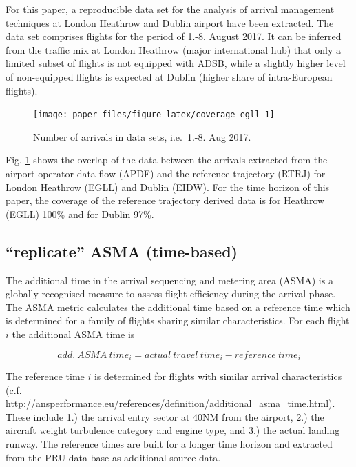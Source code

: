\documentclass[conference,final,a4paper,]{IEEEtran}
\begin{document}
For this paper, a reproducible data set for the analysis of arrival management techniques at London Heathrow and Dublin airport have been extracted.
The data set comprises flights for the period of 1.-8. August 2017.
It can be inferred from the traffic mix at London Heathrow (major international hub) that only a limited subset of flights is not equipped with ADSB, while a slightly higher level of non-equipped flights is expected at Dublin (higher share of intra-European flights).



\begin{figure}[hbt]

{\centering \texttt{[image: paper\_files/figure-latex/coverage-egll-1]} 

}

\caption{Number of arrivals in data sets, i.e.~1.-8. Aug 2017.}\label{fig:coverage-egll}
\end{figure}

Fig. \ref{fig:coverage-egll} shows the overlap of the data between the arrivals extracted from the airport operator data flow (APDF) and the reference trajectory (RTRJ) for London Heathrow (EGLL) and Dublin (EIDW).
For the time horizon of this paper, the coverage of the reference trajectory derived data is for Heathrow (EGLL) 100\% and for Dublin 97\%.

\hypertarget{replicate-asma-time-based}{%
\subsection{``replicate'' ASMA (time-based)}\label{replicate-asma-time-based}}

The additional time in the arrival sequencing and metering area (ASMA) is a globally recognised measure to assess flight efficiency during the arrival phase.
The ASMA metric calculates the additional time based on a reference time which is determined for a family of flights sharing similar characteristics.
For each flight \(i\) the additional ASMA time is

\[{add.~ASMA~time}_i = {actual~travel~time}_i - {reference~time}_i\]

The reference time \(i\) is determined for flights with similar arrival characteristics (c.f. \url{http://ansperformance.eu/references/definition/additional_asma_time.html}). These include 1.) the arrival entry sector at 40NM from the airport, 2.) the aircraft weight turbulence category and engine type, and 3.) the actual landing runway.
The reference times are built for a longer time horizon and extracted from the PRU data base as additional source data.
\end{document}
